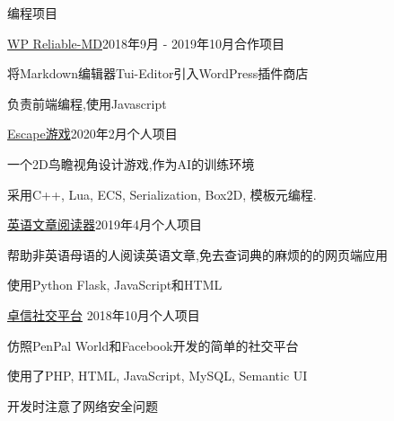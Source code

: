 \documentclass[UTF8]{resume} %
\begin{document}
\begin{rSection}{编程项目}
    
\begin{rSubsection}{\href{https://github.com/jackworkshop/WP-ReliableMD}{WP Reliable-MD}}{2018年9月 - 2019年10月}{合作项目}{}
    \item 将Markdown编辑器Tui-Editor引入WordPress插件商店
    \item 负责前端编程,使用Javascript
\end{rSubsection}

\begin{rSubsection}{\href{https://github.com/qiujiangkun/Escape}{Escape游戏}}{2020年2月}{个人项目}{}
    \item 一个2D鸟瞻视角设计游戏,作为AI的训练环境
    \item 采用C++, Lua, ECS, Serialization, Box2D, 模板元编程.
\end{rSubsection}
\begin{rSubsection}{\href{https://github.com/qiujiangkun/EnglishPassageReader}{英语文章阅读器}}{2019年4月}{个人项目}{}
    \item 帮助非英语母语的人阅读英语文章,免去查词典的麻烦的的网页端应用
    \item 使用Python Flask, JavaScript和HTML
\end{rSubsection}

\begin{rSubsection}{\href{https://github.com/qiujiangkun/ZhuoxinSocialWebsite}{卓信社交平台}} {2018年10月}{个人项目}{}

\item 仿照PenPal World和Facebook开发的简单的社交平台
\item 使用了PHP, HTML, JavaScript, MySQL, Semantic UI
\item 开发时注意了网络安全问题

\end{rSubsection}



\end{rSection}
\end{document}
